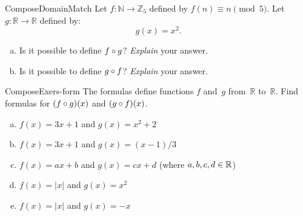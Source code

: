 \begin{exercise}{ComposeDomainMatch}
Let $f \colon \mathbb{N} \to \mathbb{Z}_5$ defined by 
$f(n) \equiv  n \pmod{5}$.
\noindent
Let $g \colon \mathbb{R} \to \mathbb{R}$ defined by:
$$g(x) = x^2.$$

\begin{enumerate}[(a)]
\item
Is it possible to define $f \circ g$? \emph{Explain} your answer.
\item
Is it possible to define $g \circ f$? \emph{Explain} your answer.
\end{enumerate}
\end{exercise}

\begin{exercise}{ComposeExers-form} 
 The formulas define functions $f$ and~$g$ from~$\mathbb{R}$ to~$\mathbb{R}$. Find formulas for $(f \circ g)(x)$ and $(g \circ f)(x)$.
\begin{enumerate}[(a)]
\item \label{ComposeExers-form-(3x+1)(x2+2)}
 $f(x) = 3x + 1$ and $g(x) = x^2 + 2$ 
\item \label{ComposeExers-form-(3x+1)(x-1/3)}
 $f(x) = 3x + 1$ and $g(x) = (x-1)/3$ 
\item \label{ComposeExers-form-(ax+b)(cx+d)}
 $f(x) = ax + b$ and $g(x) = c x + d$ (where $a,b,c,d \in \mathbb{R}$)
\item \label{ComposeExers-form-(|x|)(x2)}
 $f(x) = |x|$ and $g(x) = x^2$ 
\item \label{ComposeExers-form-(|x|)(-x)}
 $f(x) = |x|$ and $g(x) = -x$ 
\end{enumerate}
\end{exercise}

